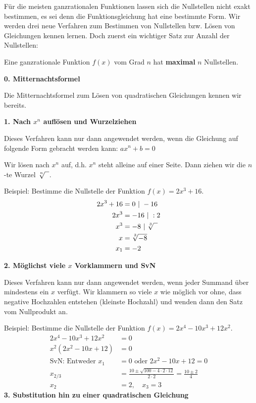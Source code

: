 Für die meisten ganzrationalen Funktionen lassen sich die Nullstellen nicht exakt bestimmen, es sei denn die Funktionsgleichung hat eine bestimmte Form. Wir werden drei neue Verfahren zum Bestimmen von Nullstellen bzw. Lösen von Gleichungen kennen lernen. Doch zuerst ein wichtiger Satz zur Anzahl der Nullstellen:

\begin{tcolorbox}[height=3cm, valign=center]\centering
	\textcolor{loestc}{Eine ganzrationale Funktion \(f(x)\) vom Grad \(n\) hat \textbf{maximal} \(n\) Nullstellen.}
\end{tcolorbox}

\textbf{0. Mitternachtsformel}

Die Mitternachtsformel zum Lösen von quadratischen Gleichungen kennen wir bereits.

\textbf{1. Nach \(x^n\) auflösen und Wurzelziehen}

Dieses Verfahren kann nur dann angewendet werden, wenn die Gleichung auf folgende Form gebracht werden kann: \(ax^n+b=0\)

Wir lösen nach \(x^n\) auf, d.h. \(x^n\) steht alleine auf einer Seite. Dann ziehen wir die \(n\)-te Wurzel \(\sqrt[\leftroot{0}\uproot{2}n]{\phantom{x}}\).

Beispiel: Bestimme die Nullstelle der Funktion \(f(x)=2x^3+16\).
{\large\textcolor{loes}{\begin{align*}
		2x^3+16&=0\ \vert\ -16\\
		2x^3&=-16\ \vert\ :2\\
		x^3&=-8\ \vert\ \sqrt[\leftroot{0}\uproot{2}3]{\phantom{x}}\\
		x&=\sqrt[\leftroot{0}\uproot{2}3]{-8}\\
		x_1&=-2
\end{align*}}}

\textbf{2. Möglichst viele \(x\) Vorklammern und SvN}

Dieses Verfahren kann nur dann angewendet werden, wenn jeder Summand über mindestens ein \(x\) verfügt. Wir klammern so viele \(x\) wie möglich vor ohne, dass negative Hochzahlen entstehen (kleinste Hochzahl) und wenden dann den Satz vom Nullprodukt an.

Beispiel: Bestimme die Nullstelle der Funktion \(f(x)=2x^4-10x^3+12x^2\).
{\large\textcolor{loes}{\begin{align*}
		2x^4-10x^3+12x^2&=0\\
		x^2\left(2x^2-10x+12\right) &=0\\
		\text{SvN: Entweder }x_1&=0 \text{ oder }2x^2-10x+12=0\\
		x_{2/3}&=\frac{10\pm\sqrt{100-4\cdot 2\cdot 12}}{2\cdot 2}=\frac{10\pm 2}{4}\\
		x_2&=2,\quad x_3=3
\end{align*}}}\newpage
\textbf{3. Substitution hin zu einer quadratischen Gleichung}

